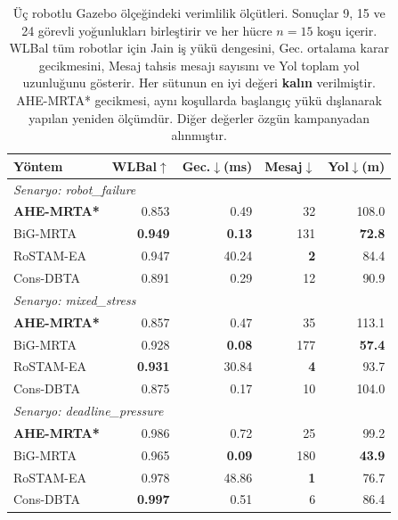 \begin{table}[t]
\centering
\caption{Üç robotlu Gazebo ölçeğindeki verimlilik ölçütleri. Sonuçlar 9, 15
ve 24 görevli yoğunlukları birleştirir ve her hücre $n{=}15$ koşu içerir.
WLBal tüm robotlar için Jain iş yükü dengesini, Gec. ortalama karar
gecikmesini, Mesaj tahsis mesajı sayısını ve Yol toplam yol uzunluğunu
gösterir. Her sütunun en iyi değeri \textbf{kalın} verilmiştir. AHE-MRTA*
gecikmesi, aynı koşullarda başlangıç yükü dışlanarak yapılan yeniden ölçümdür.
Diğer değerler özgün kampanyadan alınmıştır.}
\label{tab:efficiency}
\small
\begin{tabular}{lrrrr}
\toprule
\textbf{Yöntem} & \textbf{WLBal$\uparrow$} & \textbf{Gec.$\downarrow$(ms)} & \textbf{Mesaj$\downarrow$} & \textbf{Yol$\downarrow$(m)} \\
\midrule
\multicolumn{5}{l}{\textit{Senaryo: robot\_failure}} \\
\textbf{AHE-MRTA*} & 0.853 & 0.49 & 32 & 108.0 \\
BiG-MRTA & \textbf{0.949} & \textbf{0.13} & 131 & \textbf{72.8} \\
RoSTAM-EA & 0.947 & 40.24 & \textbf{2} & 84.4 \\
Cons-DBTA & 0.891 & 0.29 & 12 & 90.9 \\
\midrule
\multicolumn{5}{l}{\textit{Senaryo: mixed\_stress}} \\
\textbf{AHE-MRTA*} & 0.857 & 0.47 & 35 & 113.1 \\
BiG-MRTA & 0.928 & \textbf{0.08} & 177 & \textbf{57.4} \\
RoSTAM-EA & \textbf{0.931} & 30.84 & \textbf{4} & 93.7 \\
Cons-DBTA & 0.875 & 0.17 & 10 & 104.0 \\
\midrule
\multicolumn{5}{l}{\textit{Senaryo: deadline\_pressure}} \\
\textbf{AHE-MRTA*} & 0.986 & 0.72 & 25 & 99.2 \\
BiG-MRTA & 0.965 & \textbf{0.09} & 180 & \textbf{43.9} \\
RoSTAM-EA & 0.978 & 48.86 & \textbf{1} & 76.7 \\
Cons-DBTA & \textbf{0.997} & 0.51 & 6 & 86.4 \\
\bottomrule
\end{tabular}
\end{table}
